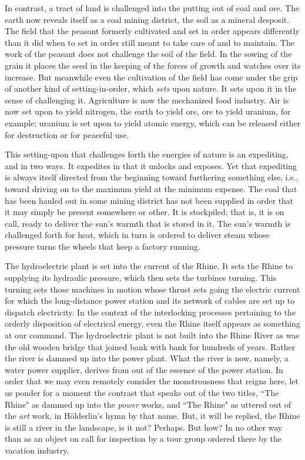 In contrast, a tract of land is challenged into the putting out of coal and ore. The earth now reveals itself as a coal mining district, the soil as a mineral desposit. The field that the peasant formerly cultivated and set in order appears differently than it did when to set in order still meant to take care of and to maintain. The work of the peasant does not challenge the soil of the field. In the sowing of the grain it places the seed in the keeping of the forces of growth and watches over its increase. But meanwhile even the cultivation of the field has come under the grip of another kind of setting-in-order, which \textit{sets} upon nature. It sets upon it in the sense of challenging it. Agriculture is now the mechanized food industry. Air is now set upon to yield nitrogen, the earth to yield ore, ore to yield uranium, for example; uranium is set upon to yield atomic energy, which can be released either for destruction or for peaceful use.

This setting-upon that challenges forth the energies of nature is an expediting, and in two ways. It expedites in that it unlocks and exposes. Yet that expediting is always itself directed from the beginning toward furthering something else, i.e., toward driving on to the maximum yield at the minimum expense. The coal that has been hauled out in some mining district has not been supplied in order that it may simply be present somewhere or other. It is stockpiled; that is, it is on call, ready to deliver the sun's warmth that is stored in it. The sun's warmth is challenged forth for heat, which in turn is ordered to deliver steam whose pressure turns the wheels that keep a factory running.

The hydroelectric plant is set into the current of the Rhine. It sets the Rhine to supplying its hydraulic pressure, which then sets the turbines turning. This turning sets those machines in motion whose thrust sets going the electric current for which the long-distance power station and its network of cables are set up to dispatch electricity. In the context of the interlocking processes pertaining to the orderly disposition of electrical energy, even the Rhine itself appears as something at our command. The hydroelectric plant is not built into the Rhine River as was the old wooden bridge that joined bank with bank for hundreds of years. Rather the river is dammed up into the power plant. What the river is now, namely, a water power supplier, derives from out of the essence of the power station. In order that we may even remotely consider the monstrousness that reigns here, let us ponder for a moment the contrast that speaks out of the two titles, ``The Rhine" as dammed up into the \textit{power} works, and ``The Rhine" as uttered out of the \textit{art} work, in H\"{o}lderlin's hymn by that name. But, it will be replied, the Rhine is still a river in the landscape, is it not? Perhaps. But how? In no other way than as an object on call for inspection by a tour group ordered there by the vacation industry.

